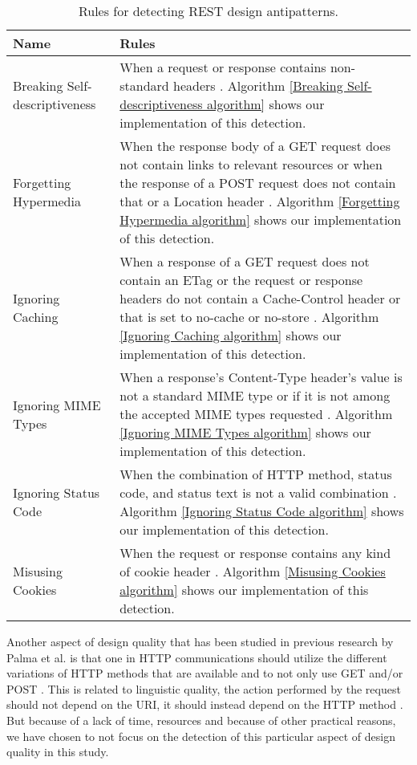 \begin{table}[!ht]
\begin{center}
\small
\begin{tabular}{|p{5cm}|p{9cm}|}
\hline \textbf{Name} & \textbf{Rules} \\
\hline 
Breaking Self-descriptiveness &
When a request or response contains non-standard headers \cite{design}. Algorithm \ref{Breaking Self-descriptiveness algorithm} shows our implementation of this detection.


\\ \hline
Forgetting Hypermedia &
When the response body of a GET request does not contain links to relevant resources or when the response of a POST request does not contain that or a Location header \cite{design}. Algorithm \ref{Forgetting Hypermedia algorithm} shows our implementation of this detection.

\\ \hline
Ignoring Caching &
When a response of a GET request does not contain an ETag or the request or response headers do not contain a Cache-Control header or that is set to no-cache or no-store \cite{design}. Algorithm \ref{Ignoring Caching algorithm} shows our implementation of this detection.

\\ \hline
Ignoring MIME Types &
When a response's Content-Type header's value is not a standard MIME type or if it is not among the accepted MIME types requested \cite{design}. Algorithm \ref{Ignoring MIME Types algorithm} shows our implementation of this detection.

\\ \hline
Ignoring Status Code &
When the combination of HTTP method, status code, and status text is not a valid combination \cite{design}. Algorithm \ref{Ignoring Status Code algorithm} shows our implementation of this detection.

\\ \hline
Misusing Cookies &
When the request or response contains any kind of cookie header \cite{design}. Algorithm \ref{Misusing Cookies algorithm} shows our implementation of this detection.

\\ \hline
\end{tabular}
 \caption{Rules for detecting REST design antipatterns.}
 \label{tab:RulesfordetectingRESTdesignantipatterns}
 \end{center}
\end{table}

Another aspect of design quality that has been studied in previous research by Palma et al. is that one in HTTP communications should utilize the different variations of HTTP methods that are available and to not only use GET and/or POST \cite{design}. This is related to linguistic quality, the action performed by the request should not depend on the URI, it should instead depend on the HTTP method \cite{linguistic}\cite{design}. But because of a lack of time, resources and because of other practical reasons, we have chosen to not focus on the detection of this particular aspect of design quality in this study. 

